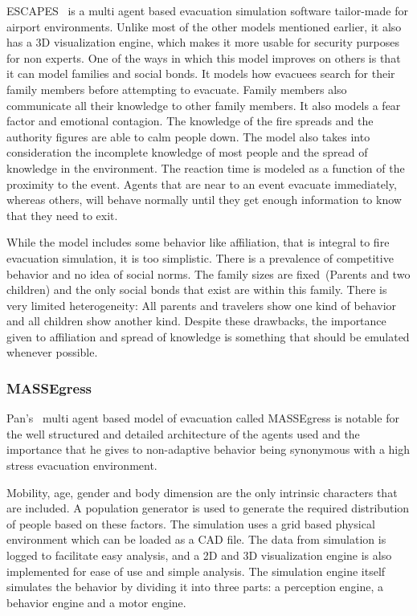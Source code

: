 ESCAPES~\cite{Tsai:2011tz} is a multi agent based evacuation simulation software tailor-made for airport environments. Unlike most of the other models mentioned earlier, it also has a 3D visualization engine, which makes it more usable for security purposes for non experts. One of the ways in which this model improves on others is that it can model families and social bonds. It models how evacuees search for their family members before attempting to evacuate. Family members also communicate all their knowledge to other family members. It also models a fear factor and emotional contagion. The knowledge of the fire spreads and the authority figures are able to calm people down. The model also takes into consideration the incomplete knowledge of most people and the spread of knowledge in the environment. The reaction time is modeled as a function of the proximity to the event. Agents that are near to an event evacuate immediately, whereas others, will behave normally until they get enough information to know that they need to exit.

While the model includes some behavior like affiliation, that is integral to fire evacuation simulation, it is too simplistic. There is a prevalence of competitive behavior and no idea of social norms. The family sizes are fixed~(Parents and two children) and the only social bonds that exist are within this family. There is very limited heterogeneity: All parents and travelers show one kind of behavior and all children show another kind. Despite these drawbacks, the importance given to affiliation and spread of knowledge is something that should be emulated whenever possible.

\subsubsection{MASSEgress}
Pan's~\cite{Pan:2006vp} multi agent based model of evacuation called MASSEgress is notable for the well structured and detailed architecture of the agents used and the importance that he gives to non-adaptive behavior being synonymous with a high stress evacuation environment.

Mobility, age, gender and body dimension are the only intrinsic characters that are included. A population generator is used to generate the required distribution of people based on these factors. The simulation uses a grid based physical environment which can be loaded as a CAD file. The data from simulation is logged to facilitate easy analysis, and a 2D and 3D visualization engine is also implemented for ease of use and simple analysis. The simulation engine itself simulates the behavior by dividing it into three parts: a perception engine, a behavior engine and a motor engine.


